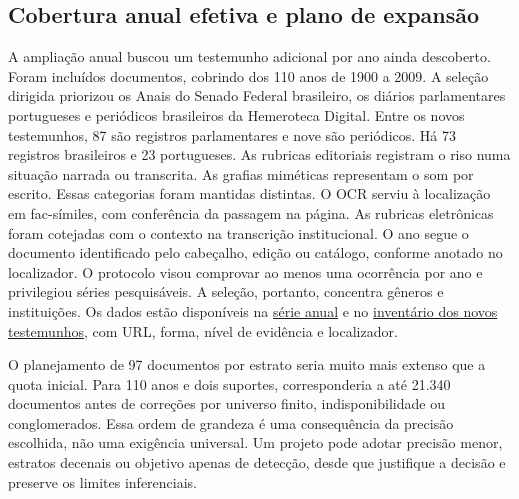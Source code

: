 \subsection{Cobertura anual efetiva e plano de expansão}
A ampliação anual buscou um testemunho adicional por ano ainda descoberto. Foram incluídos \AnnualAdded{} documentos, cobrindo \AnnualCovered{} dos 110 anos de 1900 a 2009. A seleção dirigida priorizou os Anais do Senado Federal brasileiro, os diários parlamentares portugueses e periódicos brasileiros da Hemeroteca Digital. Entre os novos testemunhos, 87 são registros parlamentares e nove são periódicos. Há 73 registros brasileiros e 23 portugueses. As rubricas editoriais registram o riso numa situação narrada ou transcrita. As grafias miméticas representam o som por escrito. Essas categorias foram mantidas distintas. O OCR serviu à localização em fac-símiles, com conferência da passagem na página. As rubricas eletrônicas foram cotejadas com o contexto na transcrição institucional. O ano segue o documento identificado pelo cabeçalho, edição ou catálogo, conforme anotado no localizador. O protocolo visou comprovar ao menos uma ocorrência por ano e privilegiou séries pesquisáveis. A seleção, portanto, concentra gêneros e instituições. Os dados estão disponíveis na \href{https://github.com/murilloed/historia-riso-escrito-portugues/blob/main/data/annual_coverage.csv}{série anual} e no \href{https://github.com/murilloed/historia-riso-escrito-portugues/blob/main/data/annual_supplement.csv}{inventário dos novos testemunhos}, com URL, forma, nível de evidência e localizador.

O planejamento de 97 documentos por estrato seria muito mais extenso que a quota inicial. Para 110 anos e dois suportes, corresponderia a até 21.340 documentos antes de correções por universo finito, indisponibilidade ou conglomerados. Essa ordem de grandeza é uma consequência da precisão escolhida, não uma exigência universal. Um projeto pode adotar precisão menor, estratos decenais ou objetivo apenas de detecção, desde que justifique a decisão e preserve os limites inferenciais.
